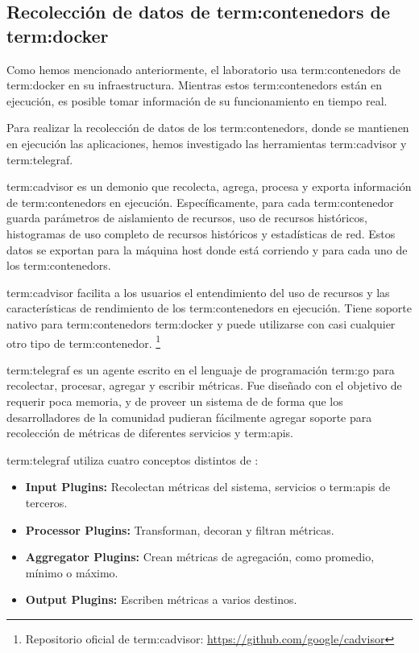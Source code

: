 \subsection{Recolección de datos de \glspl{term:contenedor} de \gls{term:docker}}
\label{contenedores}

Como hemos mencionado anteriormente, el laboratorio usa \glspl{term:contenedor}
de \gls{term:docker} en su infraestructura. Mientras estos
\glspl{term:contenedor} están en ejecución, es posible tomar información de su
funcionamiento en tiempo real.

Para realizar la recolección de datos de los \glspl{term:contenedor}, donde se
mantienen en ejecución las aplicaciones, hemos investigado las herramientas
\gls{term:cadvisor} y \gls{term:telegraf}.

\gls{term:cadvisor} es un demonio que recolecta, agrega,
procesa y exporta información de \glspl{term:contenedor} en ejecución.
Específicamente, para cada \gls{term:contenedor} guarda parámetros de
aislamiento de recursos, uso de recursos históricos, histogramas de uso
completo de recursos históricos y estadísticas de red. Estos datos se exportan
para la máquina host donde está corriendo y para cada uno de los
\glspl{term:contenedor}.

\gls{term:cadvisor} facilita a los usuarios el entendimiento del uso de
recursos y las características de rendimiento de los \glspl{term:contenedor} en
ejecución.  Tiene soporte nativo para \glspl{term:contenedor} \gls{term:docker}
y puede utilizarse con casi cualquier otro tipo de \gls{term:contenedor}.
\footnote{Repositorio oficial de \gls{term:cadvisor}: \url{https://github.com/google/cadvisor}}

\gls{term:telegraf} es un agente escrito en el lenguaje de programación \gls{term:go} para
recolectar, procesar, agregar y escribir métricas. Fue diseñado con el objetivo
de requerir poca memoria, y de proveer un sistema de  de forma que
los desarrolladores de la comunidad pudieran fácilmente agregar soporte para
recolección de métricas de diferentes servicios y \glspl{term:api}.

\gls{term:telegraf} utiliza cuatro conceptos distintos de :

\begin{itemize}

  \item \textbf{Input Plugins:}
  Recolectan métricas del sistema, servicios o \glspl{term:api} de terceros.

  \item \textbf{Processor Plugins:}
  Transforman, decoran y filtran métricas.

  \item \textbf{Aggregator Plugins:}
  Crean métricas de agregación, como promedio, mínimo o máximo.

  \item \textbf{Output Plugins:}
  Escriben métricas a varios destinos.

\end{itemize}

